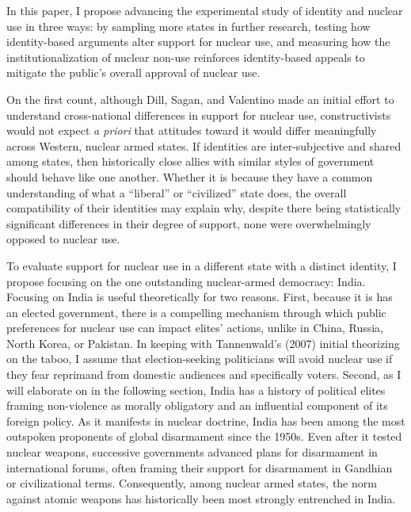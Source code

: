 \documentclass[12pt]{article}
\begin{document}
In this paper, I propose advancing the experimental study of identity and nuclear use in three ways: by sampling more states in further research, testing how identity-based arguments alter support for nuclear use, and measuring how the institutionalization of nuclear non-use reinforces identity-based appeals to mitigate the public's overall approval of nuclear use.

On the first count, although Dill, Sagan, and Valentino made an initial effort to understand cross-national differences in support for nuclear use, constructivists would not expect \textit{a priori} that attitudes toward it would differ meaningfully across Western, nuclear armed states. If identities are inter-subjective and shared among states, then historically close allies with similar styles of government should behave like one another. Whether it is because they have a common understanding of what a “liberal” or “civilized” state does, the overall compatibility of their identities may explain why, despite there being statistically significant differences in their degree of support, none were overwhelmingly opposed to nuclear use.

To evaluate support for nuclear use in a different state with a distinct identity, I propose focusing on the one outstanding nuclear-armed democracy: India. Focusing on India is useful theoretically for two reasons. First, because it is has an elected government, there is a compelling mechanism through which public preferences for nuclear use can impact elites' actions, unlike in China, Russia, North Korea, or Pakistan. In keeping with Tannenwald's (2007) initial theorizing on the taboo, I assume that election-seeking politicians will avoid nuclear use if they fear reprimand from domestic audiences and specifically voters. Second, as I will elaborate on in the following section, India has a history of political elites framing non-violence as morally obligatory and an influential component of its foreign policy. As it manifests in nuclear doctrine, India has been among the most outspoken proponents of global disarmament since the 1950s. Even after it tested nuclear weapons, successive governments advanced plans for disarmament in international forums, often framing their support for disarmament in Gandhian or civilizational terms. Consequently, among nuclear armed states, the norm against atomic weapons has historically been most strongly entrenched in India.
\end{document}
